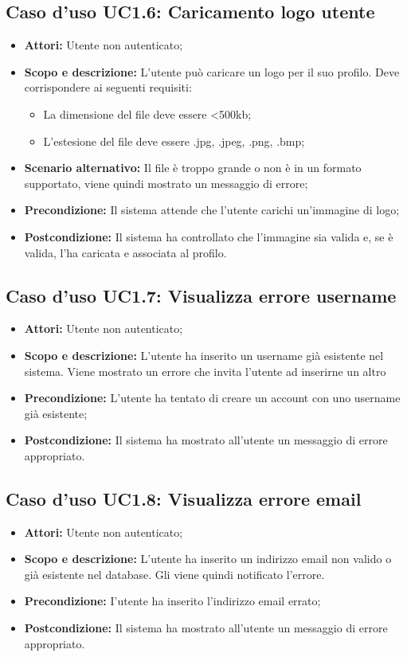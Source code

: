 \documentclass[12pt,a4paper,titlepage]{article}
\begin{document}
	\subsection{Caso d'uso UC1.6: Caricamento logo utente}
	\label{UC1.6}
	\begin{itemize}
		\item \textbf{Attori: }Utente non autenticato;
		\item \textbf{Scopo e descrizione: }L'utente può caricare un logo per il suo profilo. Deve corrispondere ai seguenti requisiti:
		\begin{itemize}
			\item La dimensione del file deve essere <500kb;
			\item L'estesione del file deve essere .jpg, .jpeg, .png, .bmp;
		\end{itemize}
		\item \textbf{Scenario alternativo: }Il file è troppo grande o non è in un formato supportato, viene quindi mostrato un messaggio di errore;
		\item \textbf{Precondizione: }Il sistema attende che l'utente carichi un'immagine di logo;
		\item \textbf{Postcondizione: }Il sistema ha controllato che l'immagine sia valida e, se è valida, l'ha caricata e associata al profilo.
	\end{itemize}
	\subsection{Caso d'uso UC1.7: Visualizza errore username}
	\label{UC1.7}
	\begin{itemize}
		\item \textbf{Attori: }Utente non autenticato;
		\item \textbf{Scopo e descrizione: }L'utente ha inserito un username già esistente nel sistema. Viene mostrato un errore che invita l'utente ad inserirne un altro
		\item \textbf{Precondizione: }L'utente ha tentato di creare un account con uno username già esistente;
		\item \textbf{Postcondizione: }Il sistema ha mostrato all'utente un messaggio di errore appropriato.
	\end{itemize}
	\subsection{Caso d'uso UC1.8: Visualizza errore email}
	\label{UC1.8}
	\begin{itemize}
		\item \textbf{Attori: }Utente non autenticato;
		\item \textbf{Scopo e descrizione: }L'utente ha inserito un indirizzo email non valido o già esistente nel database. Gli viene quindi notificato l'errore.
		\item \textbf{Precondizione: }I'utente ha inserito l'indirizzo email errato;
		\item \textbf{Postcondizione: }Il sistema ha mostrato all'utente un messaggio di errore appropriato.
	\end{itemize}
\end{document}
